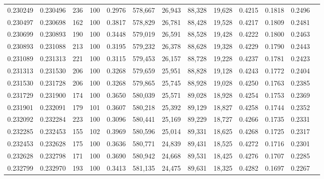 \begin{tabular}{rrrrrrrrrrrrr}
0.230249 & 0.230496 &   236 & 100 &                                     0.2976 & 578,667 &  26,943 &  88,328 &  19,628 & 0.4215 & 0.1818 & 0.2496 \\
0.230497 & 0.230698 &   162 & 100 &                                     0.3817 & 578,829 &  26,781 &  88,428 &  19,528 & 0.4217 & 0.1809 & 0.2481 \\
0.230699 & 0.230893 &   190 & 100 &                                     0.3448 & 579,019 &  26,591 &  88,528 &  19,428 & 0.4222 & 0.1800 & 0.2463 \\
0.230893 & 0.231088 &   213 & 100 &                                     0.3195 & 579,232 &  26,378 &  88,628 &  19,328 & 0.4229 & 0.1790 & 0.2443 \\
0.231089 & 0.231313 &   221 & 100 &                                     0.3115 & 579,453 &  26,157 &  88,728 &  19,228 & 0.4237 & 0.1781 & 0.2423 \\
0.231313 & 0.231530 &   206 & 100 &                                     0.3268 & 579,659 &  25,951 &  88,828 &  19,128 & 0.4243 & 0.1772 & 0.2404 \\
0.231530 & 0.231728 &   206 & 100 &                                     0.3268 & 579,865 &  25,745 &  88,928 &  19,028 & 0.4250 & 0.1763 & 0.2385 \\
0.231729 & 0.231900 &   174 & 100 &                                     0.3650 & 580,039 &  25,571 &  89,028 &  18,928 & 0.4254 & 0.1753 & 0.2369 \\
0.231901 & 0.232091 &   179 & 101 &                                     0.3607 & 580,218 &  25,392 &  89,129 &  18,827 & 0.4258 & 0.1744 & 0.2352 \\
0.232092 & 0.232284 &   223 & 100 &                                     0.3096 & 580,441 &  25,169 &  89,229 &  18,727 & 0.4266 & 0.1735 & 0.2331 \\
0.232285 & 0.232453 &   155 & 102 &                                     0.3969 & 580,596 &  25,014 &  89,331 &  18,625 & 0.4268 & 0.1725 & 0.2317 \\
0.232453 & 0.232628 &   175 & 100 &                                     0.3636 & 580,771 &  24,839 &  89,431 &  18,525 & 0.4272 & 0.1716 & 0.2301 \\
0.232628 & 0.232798 &   171 & 100 &                                     0.3690 & 580,942 &  24,668 &  89,531 &  18,425 & 0.4276 & 0.1707 & 0.2285 \\
0.232799 & 0.232970 &   193 & 100 &                                     0.3413 & 581,135 &  24,475 &  89,631 &  18,325 & 0.4282 & 0.1697 & 0.2267 \\

\end{tabular}
